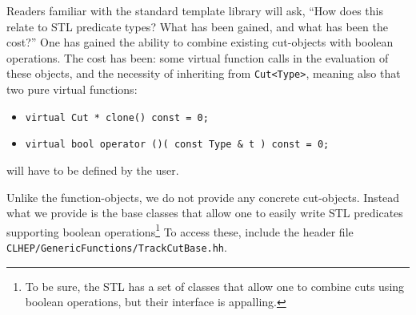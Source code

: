 \documentclass{report}
\begin{document}
Readers familiar with the standard template library will ask, ``How does
this relate to STL predicate types?  What has been gained, and what has 
been the cost?''  One has gained the ability to combine existing cut-objects
with boolean operations.  The cost has been:  some virtual function calls
in the evaluation of these objects, and the necessity of inheriting from 
\verb+Cut<Type>+, meaning also that two pure virtual functions:
\begin{itemize}
\item{\verb+virtual Cut * clone() const = 0;+   }
\item{\verb+virtual bool operator ()( const Type & t ) const = 0;+}
\end{itemize}
will have to be defined by the user.  

Unlike the function-objects, we do not provide any concrete cut-objects.  Instead
what we provide is the base classes that allow one to easily write STL predicates
supporting boolean operations\footnote{To be sure, the STL has a set of classes that
allow one to combine cuts using boolean operations, but their interface
is appalling.} To access these, include the header file \verb+CLHEP/GenericFunctions/TrackCutBase.hh+.
\end{document}
